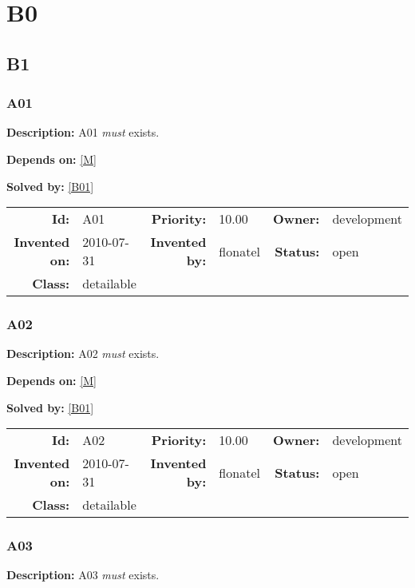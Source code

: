 \chapter{B0}
\section{B1}
\subsection{A01}\label{A01}
\textbf{Description:} A01 \textsl{must} exists.

\textbf{Depends on:} \ref{M} 

\textbf{Solved by:} \ref{B01} 

\par
{\small \begin{center}\begin{tabular}{rlrlrl}
\textbf{Id:} & A01  & \textbf{Priority:} & 10.00  & \textbf{Owner:} & development\\ 
\textbf{Invented on:} & 2010-07-31  & \textbf{Invented by:} & flonatel  & \textbf{Status:} & open \\ 
\textbf{Class:} & detailable  & & & \end{tabular}\end{center} }
\subsection{A02}\label{A02}
\textbf{Description:} A02 \textsl{must} exists.

\textbf{Depends on:} \ref{M} 

\textbf{Solved by:} \ref{B01} 

\par
{\small \begin{center}\begin{tabular}{rlrlrl}
\textbf{Id:} & A02  & \textbf{Priority:} & 10.00  & \textbf{Owner:} & development\\ 
\textbf{Invented on:} & 2010-07-31  & \textbf{Invented by:} & flonatel  & \textbf{Status:} & open \\ 
\textbf{Class:} & detailable  & & & \end{tabular}\end{center} }
\subsection{A03}\label{A03}
\textbf{Description:} A03 \textsl{must} exists.

